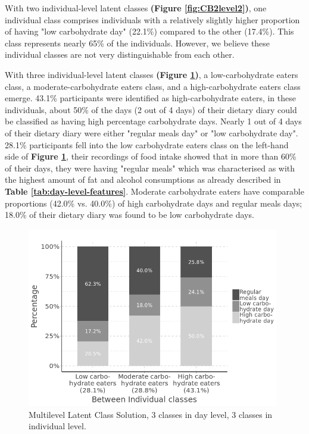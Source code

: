 With two individual-level latent classes \textbf{(Figure \ref{fig:CB2level2})}, one individual class comprises individuals with a relatively slightly higher proportion of having "low carbohydrate day" (22.1\%) compared to the other (17.4\%). This class represents nearly 65\% of the individuals. However, we believe these individual classes are not very distinguishable from each other.

With three individual-level latent classes \textbf{(Figure \ref{fig:level2})}, a low-carbohydrate eaters class, a moderate-carbohydrate eaters class, and a high-carbohydrate eaters class emerge. 43.1\% participants were identified as high-carbohydrate eaters, in these individuals, about 50\% of the days (2 out of 4 days) of their dietary diary could be classified as having high percentage carbohydrate days. Nearly 1 out of 4 days of their dietary diary were either "regular meals day" or "low carbohydrate day". 28.1\% participants fell into the low carbohydrate eaters class on the left-hand side of \textbf{Figure \ref{fig:level2}}, their recordings of food intake showed that in more than 60\% of their days, they were having "regular meals" which was characterised as with the highest amount of fat and alcohol consumptions as already described in \textbf{Table \ref{tab:day-level-features}}. Moderate carbohydrate eaters have comparable proportions (42.0\% vs. 40.0\%) of high carbohydrate days and regular meals days; 18.0\% of their dietary diary was found to be low carbohydrate days.

\begin{figure}
	\centering
	\includegraphics[width=11cm]{Figures/level2.png}
	\decoRule
	\caption[Multilevel Latent Class Solution ($3\times3$).]{Multilevel Latent Class Solution, 3 classes in day level, 3 classes in individual level.}
	\label{fig:level2}
\end{figure}

